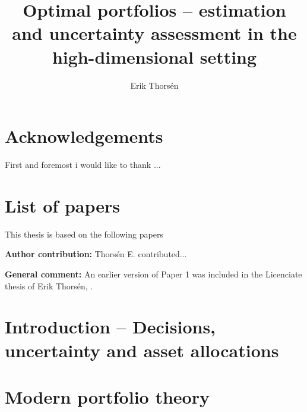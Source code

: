 \documentclass[oneside]{book}\usepackage{knitr}
\title{Optimal portfolios -- estimation and uncertainty assessment in the high-dimensional setting}
\author{Erik Thorsén}
\begin{document}


\maketitle



\chapter*{Acknowledgements}

First and foremost i would like to thank ...

\newpage
\chapter*{List of papers}
\nocite{bodnar2020sampling, javed2021tangency, bodnar2021dynamic, bodnar2021empirical, bodnar2022double}
This thesis is based on the following papers

\begingroup
\let\clearpage\relax
\printbibliography[keyword=included_in_thesis, title={Papers included in this thesis}, heading=subbibliography]
\printbibliography[keyword=papers_list, title={Papers \& other research results which are not included in this thesis},
heading=subbibliography]
\endgroup

\textbf{Author contribution:} Thors{\'e}n E. contributed...

\textbf{General comment:} An earlier version of Paper 1 was included in the Licenciate thesis of Erik Thors\'en, \citet{thorsen2019assessment}. 

%  


\tableofcontents
\chapter[Introduction]{Introduction -- Decisions, uncertainty and asset allocations}\label{ch:intro}

\chapter[Modern portfolio theory]{Modern portfolio theory}\label{ch:MPT}
\end{document}
